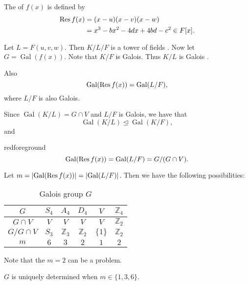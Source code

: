 \documentclass[notoc,notitlepage,nobib]{tufte-book}
\DeclareMathOperator{\Gal}{Gal}
\begin{document}
\begin{defn}\label{defn:resolvent_cubic}
  The  of $f(x)$  is defined by
  \begin{align*}
    \operatorname{Res} f(x) &= (x - u)(x - v)(x - w) \\
              &= x^3 - b x^2 - 4d x + 4bd - c^2 \in F[x].
  \end{align*}
\end{defn}

Let $L = F(u, v, w)$. Then $K / L / F$ is a tower of fields . Now
let $G = \Gal(f(x))$. Note that $K / F$ is Galois. Thus $K / L$ is Galois
.

Also
\begin{equation*}
  \Gal(\Res f(x)) = \Gal( L / F ),
\end{equation*}
where $L / F$ is also Galois.

Since $\Gal( K / L ) = G \cap V$ and $L / F$ is Galois, we have that
\begin{equation*}
  \Gal( K / L ) \trianglelefteq \Gal(K / F),
\end{equation*}
and
\begin{quotebox}{red}{foreground}
\begin{equation*}
  \Gal(\Res f(x)) = \Gal(L / F) = G / (G \cap V).
\end{equation*}
\end{quotebox}

Let $m = \abs{\Gal(\Res f(x))} = \abs{\Gal(L / F)}$. Then we have the following
possibilities:
\begin{table}[ht]
  \centering
  \caption{Galois group $G$}
  \label{table:galois_group_g}
  \begin{tabular}{c | c c c c c}
    $G$ & $S_4$ & $A_4$ & $D_4$ & $V$ & $\mathbb{Z}_4$ \\
    \hline
    $G \cap V$     & $V$   & $V$            & $V$            & $V$       & $\mathbb{Z}_2$ \\
    $G / G \cap V$ & $S_3$ & $\mathbb{Z}_3$ & $\mathbb{Z}_2$ & $\{ 1 \}$ & $\mathbb{Z}_2$ \\
    $m$            & $6$   & $3$            & $2$            & $1$       & $2$
  \end{tabular}
\end{table}
Note that the $m = 2$ can be a problem.

\begin{remark}
  $G$ is uniquely determined when $m \in \{ 1, 3, 6 \}$.
\end{remark}
\end{document}
